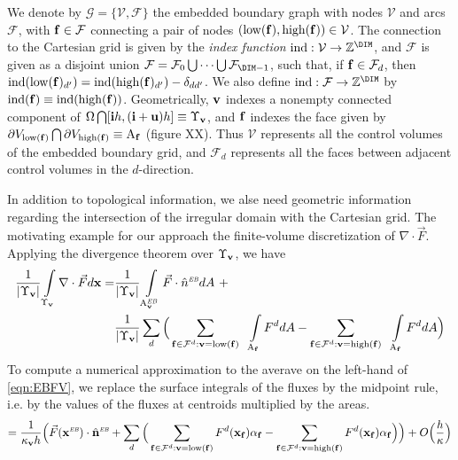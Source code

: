 \documentclass[12pt]{article}
\newcommand{\mcl}[1]{{\mathcal{#1}}}
\newcommand{\ind}{{\rm{ind}}}
\newcommand{\low}{{\rm{low}}}
\newcommand{\high}{{\rm{high}}}
\newcommand{\vol}[1]{{\Upsilon_{#1}}}
\newcommand{\area}[1]{{\rm{A}_{#1}}}
\newcommand{\vof}{{\mbf{v}}}
\newcommand{\face}{{\mbf{f}}}
\newcommand{\lr}[1]{{\langle #1 \rangle}}
\newcommand{\ebsub}{{\text{\it \tiny EB}}}
\newcommand{\areaEB}[1]{{{\rm A}_{#1}^{\ebsub}}}
\begin{document}
We denote by $\mcl{G} = \{ \mcl{V},\mcl{F} \}$ the embedded boundary graph with nodes $\mcl{V}$ and arcs $\mcl{F}$, with $\mbf{f} \in \mcl{F}$ connecting a pair of nodes
$( \low (\mbf{f}) , \high(\mbf{f}) ) \in \mcl{V}$. The connection to the Cartesian grid is given by the {\it index function} $\ind : \mcl{V} \rightarrow \mbb{Z}^\DIM$, and $\mcl{F}$ is given as a disjoint union $\mcl{F} = \mcl{F}_0 \bigcup \dots \bigcup \mcl{F}_{\DIM-1}$, such that, if $\mbf{f} \in \mcl{F}_d$, then $\ind (\low (\mbf{f} )_{d'} ) = \ind (\high (\mbf{f} )_{d'} ) - \delta_{d d'}$. We also define $\ind : \mcl{F} \rightarrow \mbb{Z}^\DIM$ by $\ind (\face) \equiv \ind(\high(\face))$. Geometrically, $\mathbf{v}$ indexes a nonempty connected component of $\Omega \bigcap [ \mbf{i} h,(\mbf{i} + \mbf{u}) h] \equiv \vol{\vof}$, and $\mathbf{f}$ indexes the face given by $\partial V_{\low(\mbf{f})} \bigcap \partial V_{\high(\mbf{f})} \equiv \area{\face}$  (figure XX). Thus $\mcl{V}$ represents all the control volumes of the embedded boundary grid, and $\mcl{F}_d$ represents all the faces between adjacent control volumes in the $d$-direction.

In addition to topological information, we alse need geometric information regarding the intersection of the irregular domain with the Cartesian grid. The motivating example for our approach the finite-volume discretization of $\nabla \cdot \vec{F}$. Applying the divergence theorem over $\vol{\vof}$, we have
\begin{align}
\frac{1}{|\vol{\vof}|} \int \limits_{\vol{\vof} } \nabla \cdot \vec{F} d \mbf{x} =  & \frac{1}{|\vol{\vof}|} \int \limits_{\areaEB{\vof}} \vec{F} \cdot \hat{n}^\ebsub d A ~ +  \nonumber
\\ & \frac{1}{|\vol{\vof}|} \sum \limits_d \Big ( \sum \limits_{\face \in \mcl{F}^d:\vof = \low(\face)} ~~ \int \limits_{\area{\face}} F^d dA -  \sum \limits_{\face \in \mcl{F}^d :\vof = \high(\face)}  ~~ \int \limits_{\area{\face}} F^d dA \Big )\label{eqn:EBFV} 
\end{align}
To compute a numerical approximation to the averave on the left-hand of \eqref{eqn:EBFV}, we replace the surface integrals of the fluxes by the midpoint rule, i.e. by the values of the fluxes at centroids multiplied by the areas. 
\begin{gather*}
= \frac{1}{\kappa_\vof h}\Big( \vec{F}(\mbf{x}^\ebsub ) \cdot \hat{\mbf{n}}^\ebsub +
\sum \limits_d \Big ( \sum \limits_{\face \in \mcl{F}^d:\vof = \low(\face)} F^d (\mbf{x}_\face ) \alpha_\face -  \sum \limits_{\face \in \mcl{F}^d :\vof = \high(\face)}   F^d (\mbf{x}_\face ) \alpha_\face \Big ) \Big ) + O \Big(\frac{h}{\kappa} \Big)
\end{gather*}
\end{document}
